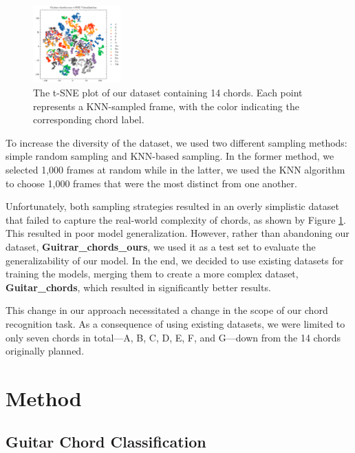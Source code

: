 \documentclass[10pt,twocolumn,letterpaper]{article}
\begin{document}
\begin{figure}[h]
  \centering
  \includegraphics[width=0.3\textwidth]{images/final/Guitar-chords-ours_tsne_plot.png}
  \caption{The t-SNE plot of our dataset containing 14 chords. Each point represents a KNN-sampled frame, with the color indicating the corresponding chord label.}
  \label{fig:ours-tsne-plot}
\end{figure}

To increase the diversity of the dataset, we used two different sampling methods: simple random sampling and KNN-based sampling. In the former method, we selected 1,000 frames at random while in the latter, we used the KNN algorithm to choose 1,000 frames that were the most distinct from one another.

Unfortunately, both sampling strategies resulted in an overly simplistic dataset that failed to capture the real-world complexity of chords, as shown by Figure \ref{fig:ours-tsne-plot}. This resulted in poor model generalization. However, rather than abandoning our dataset, \textbf{Guitrar\_chords\_ours}, we used it as a test set to evaluate the generalizability of our model. In the end, we decided to use existing datasets \cite{guitar-chord-tvon8_dataset,guitar-chord-bounding-box_dataset, guitar-chord-handshape_dataset, guitar-chords-daewp_dataset} for training the models, merging them to create a more complex dataset, \textbf{Guitar\_chords}, which resulted in significantly better results.

This change in our approach necessitated a change in the scope of our chord recognition task. As a consequence of using existing datasets, we were limited to only seven chords in total—A, B, C, D, E, F, and G—down from the 14 chords originally planned.

\section{Method}

\subsection{Guitar Chord Classification}
\end{document}
